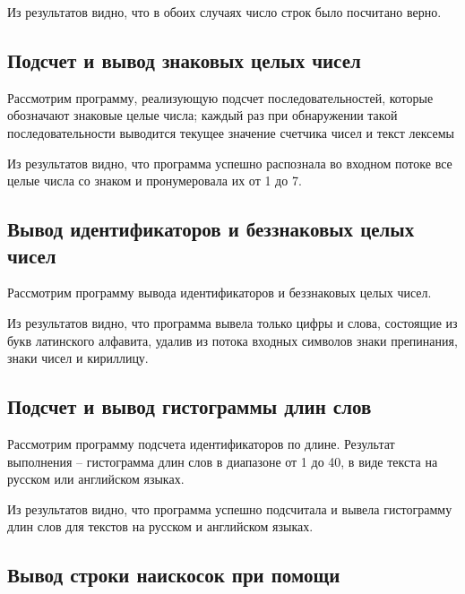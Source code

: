 
Из результатов видно, что в обоих случаях число строк было посчитано верно.

\subsection{Подсчет и вывод знаковых целых чисел}

Рассмотрим программу, реализующую подсчет последовательностей, которые обозначают знаковые целые числа; каждый раз при обнаружении такой последовательности выводится текущее значение счетчика чисел и текст лексемы



Из результатов видно, что программа успешно распознала во входном потоке все целые числа со знаком и пронумеровала их от 1 до 7.

\subsection{Вывод идентификаторов и беззнаковых целых чисел}

Рассмотрим программу вывода идентификаторов и беззнаковых целых чисел.



Из результатов видно, что программа вывела только цифры и слова, состоящие из букв латинского алфавита, удалив из потока входных символов знаки препинания, знаки чисел и кириллицу. 

\subsection{Подсчет и вывод гистограммы длин слов}

Рассмотрим программу подсчета идентификаторов по длине. Результат выполнения -- гистограмма длин слов в диапазоне от 1 до 40, в виде текста на русском или английском языках.
 



Из результатов видно, что программа успешно подсчитала и вывела гистограмму длин слов для текстов на русском и английском языках.

\subsection{Вывод строки наискосок при помощи }

